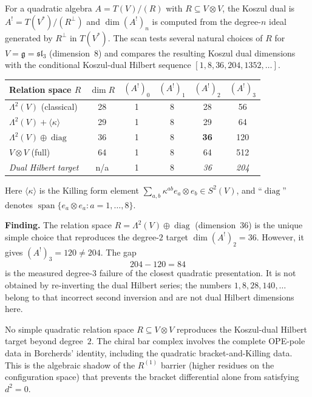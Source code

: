 \begin{computation}
\label{comp:sl3-koszul-dual-scan}

For a quadratic algebra $A = T(V)/(R)$ with $R \subseteq V \otimes V$,
the Koszul dual is $A^! = T(V^*) / (R^\perp)$ and $\dim(A^!)_n$
is computed from the degree-$n$ ideal generated by $R^\perp$ in
$T(V^*)$. The scan tests several natural choices of $R$ for
$V = \mathfrak{g} = \mathfrak{sl}_3$ (dimension~$8$) and compares
the resulting Koszul dual dimensions with the conditional
Koszul-dual Hilbert sequence
$[1, 8, 36, 204, 1352, \ldots]$.

\medskip
\noindent
\begin{center}
\begin{tabular}{l|c|cccc}
Relation space $R$ & $\dim R$ & $(A^!)_0$ & $(A^!)_1$ & $(A^!)_2$ & $(A^!)_3$ \\
\hline
$\Lambda^2(V)$ (classical) & 28 & 1 & 8 & 28 & 56 \\
$\Lambda^2(V) + \langle \kappa \rangle$ & 29 & 1 & 8 & 29 & 64 \\
$\Lambda^2(V) \oplus \operatorname{diag}$ & 36 & 1 & 8 & \textbf{36} & 120 \\
$V \otimes V$ (full) & 64 & 1 & 8 & 64 & 512 \\
\hline
\textit{Dual Hilbert target} & n/a & 1 & 8 & \textit{36} & \textit{204}
\end{tabular}
\end{center}

Here $\langle \kappa \rangle$ is the Killing form element
$\sum_{a,b} \kappa^{ab} e_a \otimes e_b \in S^2(V)$, and
``$\operatorname{diag}$'' denotes $\operatorname{span}\{e_a \otimes e_a
: a = 1, \ldots, 8\}$.

\medskip
\noindent\textbf{Finding.}
The relation space $R = \Lambda^2(V) \oplus \operatorname{diag}$ (dimension~$36$)
is the unique simple choice that reproduces the degree-$2$ target
$\dim(A^!)_2 = 36$. However, it gives $(A^!)_3 = 120 \neq 204$.
The gap
\[
204-120=84
\]
is the measured degree-$3$ failure of the closest quadratic
presentation. It is not obtained by re-inverting the dual Hilbert
series; the numbers $1,8,28,140,\ldots$ belong to that
incorrect second inversion and are not dual Hilbert dimensions here.

No simple quadratic relation space $R \subseteq V \otimes V$ reproduces
the Koszul-dual Hilbert target beyond degree~$2$. The chiral bar complex
involves the complete OPE-pole data in Borcherds' identity, including
the quadratic bracket-and-Killing data. This is the algebraic shadow
of the $R^{(1)}$ barrier (higher residues on the configuration space)
that prevents the bracket differential alone from satisfying $d^2 = 0$.
\end{computation}

